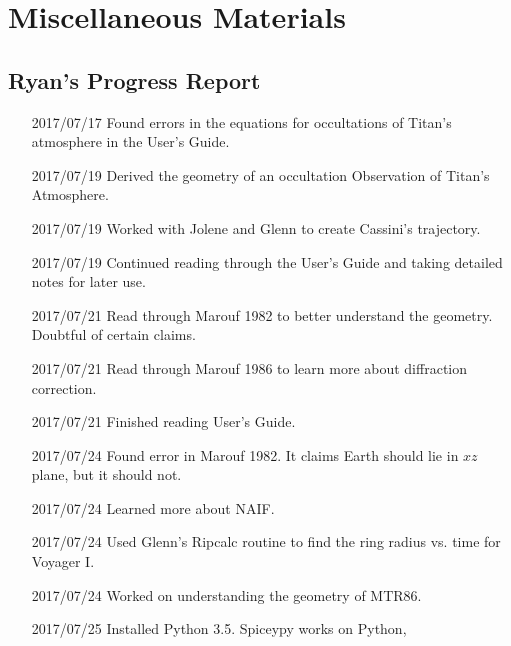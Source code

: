\documentclass[crop=false,class=article,oneside]{standalone}
\begin{document}
    \ifx\ifphysicscourseselectromagnetismI\undefined
        \section*{Miscellaneous Materials}
        \setcounter{section}{1}
    \fi
    \subsection{Ryan's Progress Report}
        \begin{enumerate}[leftmargin=55pt]
            \item[2017/07/17] Found errors in the equations
                              for occultations of Titan's atmosphere
                              in the User's Guide.
            \item[2017/07/19] Derived the geometry of an occultation
                              Observation of Titan's Atmosphere.
            \item[2017/07/19] Worked with Jolene and Glenn
                              to create Cassini's trajectory.
            \item[2017/07/19] Continued reading through the User's
                              Guide and taking detailed notes
                              for later use.
            \item[2017/07/21] Read through Marouf 1982 to better
                              understand the geometry.
                              Doubtful of certain claims.
            \item[2017/07/21] Read through Marouf 1986 to learn more
                              about diffraction correction.
            \item[2017/07/21] Finished reading User's Guide.
            \item[2017/07/24] Found error in Marouf 1982. It claims
                              Earth should lie in $xz$ plane,
                              but it should not.
            \item[2017/07/24] Learned more about NAIF.
            \item[2017/07/24] Used Glenn's Ripcalc routine to find the
                              ring radius vs. time for Voyager I.
            \item[2017/07/24] Worked on understanding the
                              geometry of MTR86.
            \item[2017/07/25] Installed Python 3.5.
                              Spiceypy works on Python,

\end{enumerate}
\end{document}
